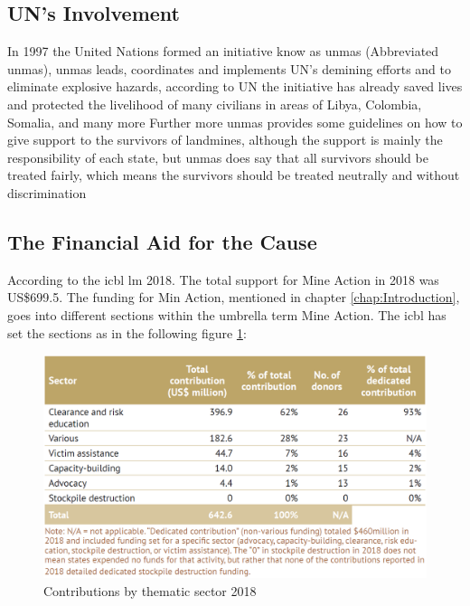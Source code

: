 \subsection{UN's Involvement}

In 1997 the United Nations formed an initiative know as \gls{unmas} (Abbreviated \gls{unmas}), \gls{unmas} leads, coordinates and implements UN's demining efforts and to eliminate explosive hazards, according to UN the initiative has already saved lives and protected the livelihood of many civilians in areas of Libya, Colombia, Somalia, and many more
Further more \gls{unmas} provides some guidelines on how to give support to the survivors of landmines, although the support is mainly the responsibility of each state, but \gls{unmas} does say that all survivors should be treated fairly, which means the survivors should be treated neutrally and without discrimination

\newpage

\subsection{The Financial Aid for the Cause}

According to the \gls{icbl} \gls{lm} 2018. The total support for Mine Action in 2018 was US\$699.5. The funding for Min Action, mentioned in chapter \ref{chap:Introduction}, goes into different sections within the umbrella term Mine Action. The \gls{icbl} has set the sections as in the following figure \ref{fig:contributions_by_thematic_sector_2018}:

\begin{figure}[ht]
  \centering
  \includegraphics[width=0.6\linewidth]{00 - Images/contributions_by_thematic_sector_2018.png}
  \caption{Contributions by thematic sector 2018 \cite{LandmineMonitor2019}}
  \label{fig:contributions_by_thematic_sector_2018}
\end{figure}

